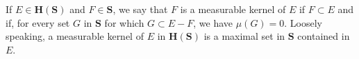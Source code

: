 If $E \in \mathbf{H}(\mathbf{S})$ and $F \in \mathbf{S}$, we say that $F$ is a measurable kernel of $E$ if $F \subset E$ and if, for every set $G$ in $\mathbf{S}$ for which $G \subset E - F$, we have $\mu(G) = 0$. Loosely speaking, a measurable kernel of $E$ in $\mathbf{H}(\mathbf{S})$ is a maximal set in $\mathbf{S}$ contained in $E$.
